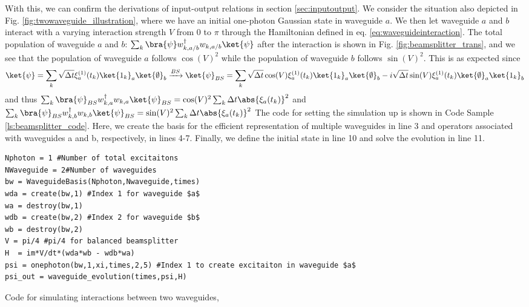 With this, we can confirm the derivations of input-output relations in section \ref{sec:inputoutput}. We consider the situation also depicted in Fig. \ref{fig:twowaveguide_illustration}, where we have an initial one-photon Gaussian state in waveguide $a$. We then let waveguide $a$ and $b$ interact with a varying interaction strength $V$ from $0$ to $\pi$ through the Hamiltonian defined in eq. \eqref{eq:waveguideinteraction}. The total population of waveguide $a$ and $b$: $\sum_k \bra{\psi} w_{k,a/b}^\dagger w_{k,a/b} \ket{\psi} $ after the interaction is shown in Fig. \ref{fig:beamsplitter_trans}, and we see that the population of waveguide $a$ follows $\cos(V)^2$ while the population of waveguide $b$ follows $\sin(V)^2$. This is as expected since
\begin{equation}
    \ket{\psi} = \sum_k \sqrt{\Delta t} \xi_a^{(1)}(t_k) \ket{1_k}_a\ket{\emptyset}_b \xrightarrow{BS} \ket{\psi}_{BS} = \sum_k \sqrt{\Delta t} \cos(V) \xi_a^{(1)}(t_k) \ket{1_k}_a\ket{\emptyset}_b - i \sqrt{\Delta t} \sin(V) \xi_a^{(1)}(t_k) \ket{\emptyset}_a\ket{1_k}_b    
\end{equation}
and thus $\sum_k 
\bra{\psi}_{BS} w_{k,a}^\dagger w_{k,a} \ket{\psi}_{BS} = \cos(V)^2 \sum_k \Delta t\abs{\xi_a(t_k)}^2 $ and $\sum_k 
\bra{\psi}_{BS} w_{k,b}^\dagger w_{k,b} \ket{\psi}_{BS} = \sin(V)^2 \sum_k \Delta t \abs{\xi_a(t_k)}^2 $
The code for setting the simulation up is shown in Code Sample \ref{ls:beamsplitter_code}. Here, we create the basis for the efficient representation of multiple waveguides in line 3 and operators associated with waveguides a and b, respectively, in lines 4-7. Finally, we define the initial state in line 10 and solve the evolution in line 11. 



\begin{listing}[H]
\begin{verbatim}
Nphoton = 1 #Number of total excitaitons
NWaveguide = 2#Number of waveguides
bw = WaveguideBasis(Nphoton,Nwaveguide,times)
wda = create(bw,1) #Index 1 for waveguide $a$
wa = destroy(bw,1)
wdb = create(bw,2) #Index 2 for waveguide $b$
wb = destroy(bw,2)
V = pi/4 #pi/4 for balanced beamsplitter
H  = im*V/dt*(wda*wb - wdb*wa)
psi = onephoton(bw,1,xi,times,2,5) #Index 1 to create excitaiton in waveguide $a$
psi_out = waveguide_evolution(times,psi,H) 
\end{verbatim}
\caption{Code for simulating interactions between two waveguides,}
\label{ls:beamsplitter_code}
\end{listing}

